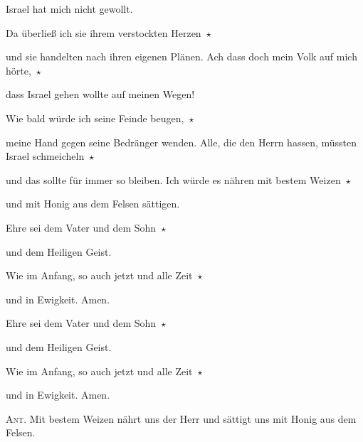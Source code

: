 Israel hat mich nicht gewollt.

\noindent Da überließ ich sie ihrem verstockten Herzen~$\star$~\nopagebreak

und sie handelten nach ihren eigenen Plänen. Ach dass doch mein Volk auf mich hörte,~$\star$~\nopagebreak

dass Israel gehen wollte auf meinen Wegen!

\noindent Wie bald würde ich seine Feinde beugen,~$\star$~\nopagebreak

meine Hand gegen seine Bedränger wenden. Alle, die den Herrn hassen, müssten Israel schmeicheln~$\star$~\nopagebreak

und das sollte für immer so bleiben. Ich würde es nähren mit bestem Weizen~$\star$~\nopagebreak

und mit Honig aus dem Felsen sättigen.

\noindent Ehre sei dem Vater und dem Sohn~$\star$~\nopagebreak

und dem Heiligen Geist.

\noindent Wie im Anfang, so auch jetzt und alle Zeit~$\star$~\nopagebreak

und in Ewigkeit. Amen.

\noindent Ehre sei dem Vater und dem Sohn~$\star$~\nopagebreak

und dem Heiligen Geist.

\noindent Wie im Anfang, so auch jetzt und alle Zeit~$\star$~\nopagebreak

und in Ewigkeit. Amen.

\vspace{10pt}

\noindent \textsc{Ant.} Mit bestem Weizen nährt uns der Herr und sättigt uns mit Honig aus dem Felsen.